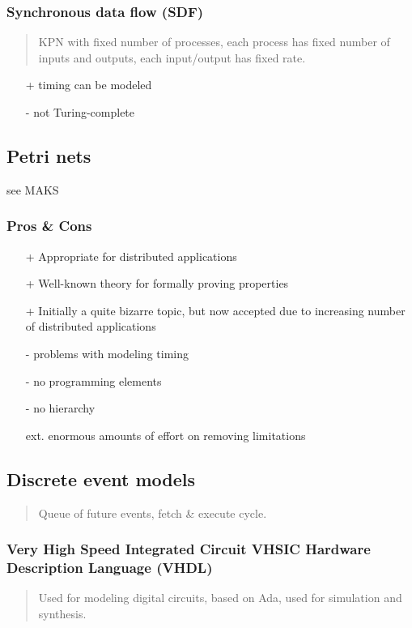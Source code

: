 \documentclass{article}
\begin{document}
\subsubsection{Synchronous data flow (SDF)}
\begin{quote}KPN with fixed number of processes, each process has fixed number of inputs and outputs, each input/output has fixed rate.\end{quote}

\begin{itemize}
  \item[+] timing can be modeled
  \item[-] not Turing-complete
\end{itemize}

\subsection{Petri nets}
see MAKS

\subsubsection{Pros \& Cons}
\begin{itemize}
  \item[+] Appropriate for distributed applications
  \item[+] Well-known theory for formally proving properties
  \item[+] Initially a quite bizarre topic, but now accepted due to increasing number of distributed applications
  \item[-] problems with modeling timing
  \item[-] no programming elements
  \item[-] no hierarchy
  \item[ext.] enormous amounts of effort on removing limitations
\end{itemize}

\subsection{Discrete event models}

\begin{quote}Queue of future events, fetch \& execute cycle.\end{quote}
\subsubsection{Very High Speed Integrated Circuit VHSIC Hardware Description Language (VHDL)}
\begin{quote}Used for modeling digital circuits, based on Ada, used for simulation and synthesis.\end{quote}
\end{document}
